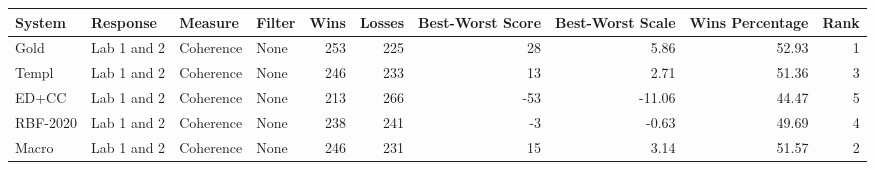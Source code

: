 \begin{tabular}{llllrrrrrr}
\toprule
System & Response & Measure & Filter & Wins & Losses & Best-Worst Score & Best-Worst Scale & Wins Percentage & Rank \\
\midrule
Gold & Lab 1 and 2 & Coherence & None & 253 & 225 & 28 & 5.86 & 52.93 & 1 \\
Templ & Lab 1 and 2 & Coherence & None & 246 & 233 & 13 & 2.71 & 51.36 & 3 \\
ED+CC & Lab 1 and 2 & Coherence & None & 213 & 266 & -53 & -11.06 & 44.47 & 5 \\
RBF-2020 & Lab 1 and 2 & Coherence & None & 238 & 241 & -3 & -0.63 & 49.69 & 4 \\
Macro & Lab 1 and 2 & Coherence & None & 246 & 231 & 15 & 3.14 & 51.57 & 2 \\
\bottomrule
\end{tabular}
